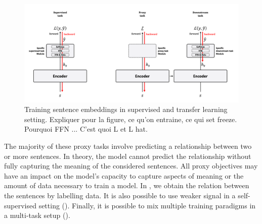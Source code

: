 \begin{figure}[!ht]
	\includegraphics[width=15cm]{images/supervised-self-supervised.png}
    \caption{Training sentence embeddings in supervised and transfer learning setting. Expliquer pour la figure, ce qu'on entraine, ce qui set freeze. Pourquoi FFN ... C'est quoi L et L hat.} 
\end{figure}

The majority of these proxy tasks involve predicting a relationship between two or more sentences. In theory, the model cannot predict the relationship without fully capturing the meaning of the considered sentences. All proxy objectives may have an impact on the model's capacity to capture aspects of meaning or the amount of data necessary to train a model. In , we obtain the relation between the sentences by labelling data. It is also possible to use weaker signal in a self-supervised setting (). Finally, it is possible to mix multiple training paradigms in a multi-task setup ().


